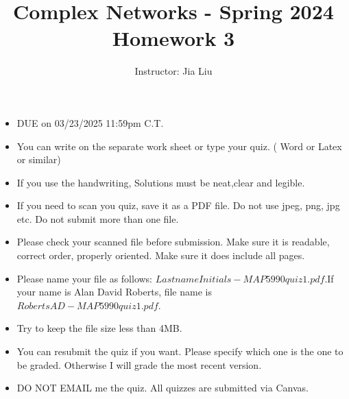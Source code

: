 \documentclass{amsart}
\theoremstyle{definition}
\theoremstyle{remark}
\numberwithin{equation}{section}
\begin{document}
\title{Complex Networks  - Spring 2024\\{\bf Homework 3}}%
\author{Instructor: Jia Liu}%
\date{}


\maketitle
\begin{itemize}
\item DUE on  03/23/2025 11:59pm C.T.
\item You can write on the separate work sheet or type your quiz. ( Word or Latex or similar)
\item If you use the handwriting, Solutions must be neat,clear and legible.
\item If you need to scan you quiz, save it as a PDF file. Do not use jpeg, png, jpg etc. Do not submit more than one file.
\item Please check your scanned file before submission. Make sure it is readable, correct order, properly oriented. Make sure it does include all pages.
\item Please name your file as follows: $LastnameInitials-MAP5990quiz1.pdf$.If your name is Alan David Roberts, file name is $RobertsAD-MAP5990quiz1.pdf$.
\item Try to keep the file size less than 4MB.
\item You can resubmit the quiz if you want. Please specify which one is the one to be graded. Otherwise I will grade the most recent version.
\item DO NOT EMAIL me the quiz. All quizzes are submitted via Canvas.
\end{itemize}
\end{document}
